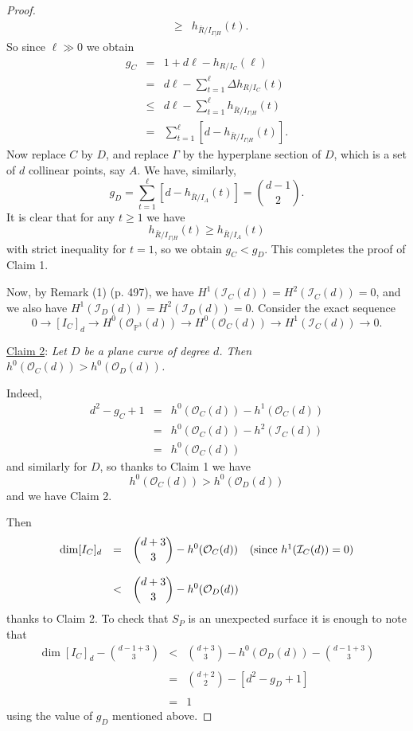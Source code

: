 \documentclass[12pt]{amsart}
\numberwithin{equation}{section}
\theoremstyle{definition}
\newcommand{\PP}{ \ensuremath{\mathbb{P}}}
\begin{document}
\begin{proof}
\[\begin{array}{rcl}
& \geq & h_{\bar R/I_{\Gamma | H}} (t).
\end{array}
\]
So since $\ell \gg 0$ we obtain
\[
\begin{array}{rcl}
g_C & = & 1 + d\ell - h_{R/I_C}(\ell) \\
& = & d\ell - \sum_{t=1}^\ell \Delta h_{R/I_C}(t) \\
& \leq & d\ell - \sum_{t=1}^\ell  h_{\bar R/I_{\Gamma|H}} (t) \\
& = & \sum_{t=1}^\ell \left [ d - h_{\bar R/I_{\Gamma | H}} (t) \right ].
\end{array}
\]
Now replace $C$ by $D$, and replace $\Gamma$ by the hyperplane section of $D$, which is a set of $d$ collinear points, say $A$.
We have, similarly,
\[
  g_D = \sum_{t=1}^\ell \left [ d - h_{\bar R/I_A}(t) \right ] = \binom{d-1}{2} .
\]
It is clear that for any $t \geq 1$ we have 
\[
h_{\bar R/I_{\Gamma|H}} (t) \geq h_{\bar R/I_A}(t)
\]
with strict inequality for $t=1$, 
so we obtain $g_C < g_D$. This completes the proof of Claim 1.

Now, by \cite{GLP} Remark (1) (p. 497), we have $H^1(\mathcal I_C(d)) = H^2(\mathcal I_C(d)) = 0$, and we also have $H^1(\mathcal I_D(d)) = H^2(\mathcal I_D(d)) = 0$.
Consider the exact sequence
\[
0 \rightarrow [I_C]_d \rightarrow H^0(\mathcal O_{\PP^3}(d)) \rightarrow H^0(\mathcal O_C(d)) \rightarrow H^1(\mathcal I_C(d)) \rightarrow 0.
\]

\medskip

\noindent \underline{Claim 2}:
{\em Let $D$ be a plane curve of degree $d$. Then $h^0(\mathcal O_C(d)) > h^0(\mathcal O_D(d))$.}

\medskip

 Indeed,
\[
\begin{array}{rcl}
d^2 - g_C + 1 & = & h^0(\mathcal O_C(d)) - h^1(\mathcal O_C(d)) \\
& = & h^0(\mathcal O_C(d)) - h^2(\mathcal I_C(d)) \\
& = & h^0(\mathcal O_C(d))
\end{array}
\]
and similarly for $D$, so thanks to Claim 1 we have
\[
h^0(\mathcal O_C(d)) > h^0(\mathcal O_D(d))
\]
and we have Claim 2.

Then
\[
\begin{array}{rcll}
 \dim [I_C]_d & = & \displaystyle \binom{d+3}{3} - h^0(\mathcal O_C(d)) & \hbox{(since } h^1(\mathcal I_C(d)) = 0 ) \\ \\
& < & \displaystyle \binom{d+3}{3} - h^0(\mathcal O_D(d))
\end{array}
\]
thanks to Claim 2. To check that $S_P$ is an unexpected surface it is enough to note that
\[
\begin{array}{rcl}
\displaystyle \dim [I_C]_d - \binom{d-1+3}{3} & < & \displaystyle \binom{d+3}{3} - h^0(\mathcal O_D(d)) - \binom{d-1+3}{3} \\ \\
& = & \displaystyle \binom{d+2}{2} - [d^2 - g_D + 1] \\ \\
& = & 1
\end{array}
\]
using the value of $g_D$ mentioned above. 
\end{proof}
\end{document}
